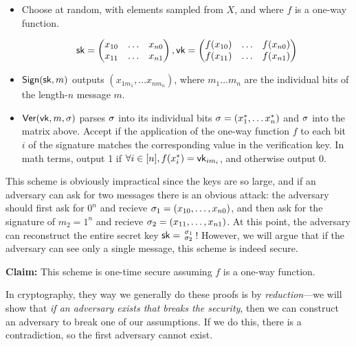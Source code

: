 \begin{itemize}
	\item Choose at random, with elements sampled from $X$, and where $f$ is a one-way function.

\[ {\mathsf{sk}} = \begin{pmatrix}
	x_{10} & \ldots & x_{n0} \\
	x_{11} & \ldots & x_{n1} \\
	\end{pmatrix}, \mathsf{vk} = \begin{pmatrix}
	f(x_{10}) & \ldots & f(x_{n0}) \\
	f(x_{11}) & \ldots & f(x_{n1}) \\
\end{pmatrix}\]
	\item $\mathsf{Sign}({\mathsf{sk}}, m)$ outputs $(x_{1m_1}, \ldots x_{nm_n})$, where $m_1 \ldots m_n$ are the individual bits of the length-$n$ message $m$.
	\item $\mathsf{Ver}(\mathsf{vk}, m, \sigma)$ parses $\sigma$ into its individual bits $\sigma = (x_1^*, \ldots x_n^*)$ and $\sigma$ into the matrix above. Accept if the application of the one-way function $f$ to each bit $i$ of the signature matches the corresponding value in the verification key. In math terms, output 1 if $\forall i \in [n], f(x^*_i) = \mathsf{vk}_{im_i}$, and otherwise output 0.
\end{itemize}

This scheme is obviously impractical since the keys are so large, and if an adversary can ask for two messages there is an obvious attack: the adversary should first ask for $0^n$ and recieve $\sigma_1 = (x_{10}, \ldots, x_{n0})$, and then ask for the signature of $m_2 = 1^n$ and recieve $\sigma_2 = (x_{11}, \ldots, x_{n1})$. At this point, the adversary can reconstruct the entire secret key ${\mathsf{sk}} = \begin{smallmatrix} \sigma_1 \\ \sigma_2 \end{smallmatrix}$! However, we will argue that if the adversary can see only a single message, this scheme is indeed secure.

\textbf{Claim:} This scheme is one-time secure assuming $f$ is a one-way function.

In cryptography, they way we generally do these proofs is by \emph{reduction}---we will show that \emph{if an adversary exists that breaks the security}, then we can construct an adversary to break one of our assumptions. If we do this, there is a contradiction, so the first adversary cannot exist.

